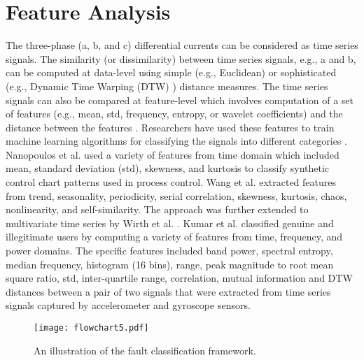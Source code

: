 \documentclass[conference]{IEEEtran}
\begin{document}
\section{Feature Analysis}
The three-phase (a, b, and c) differential currents can be considered as time series signals. The similarity (or dissimilarity) between time series signals, e.g., a and b, can be computed at data-level using simple (e.g., Euclidean) or sophisticated (e.g., Dynamic Time Warping (DTW) \cite{DTW}) distance measures. The time series signals can also be compared at feature-level which involves computation of a set of features (e.g., mean, std, frequency, entropy, or wavelet coefficients) and the distance between the features \cite{TimeSeriesFeatureRep}. Researchers have used these features to train machine learning algorithms for classifying the signals into different categories \cite{SuccessfulFeatTimeSeries}. Nanopoulos et al. \cite{NanopoulosTimeSeriesFeat} used a variety of features from time domain which included mean, standard deviation (std), skewness, and kurtosis to classify synthetic control chart patterns used in process control. Wang et al. \cite{WangTimeSeriesFeat} extracted features from trend, seasonality, periodicity, serial correlation, skewness, kurtosis, chaos, nonlinearity, and self-similarity. The approach was further extended to multivariate time series by Wirth et al. \cite{MultiVariateStructure}. Kumar et al. \cite{KumarTimeSeries, AbenaPrimo} classified genuine and illegitimate users by computing a variety of features from time, frequency, and power domains. The specific features included band power, spectral entropy, median frequency, histogram (16 bins), range, peak magnitude to root mean square ratio, std, inter-quartile range, correlation, mutual information and DTW distances between a pair of two signals that were extracted from time series signals captured by accelerometer and gyroscope sensors. %
\begin{figure}[htp!]
\centerline{\texttt{[image: flowchart5.pdf]}}
\vspace{-0.25in}
\caption{An illustration of the fault classification framework.}
\label{flowchart}
\end{figure}
\vspace{-0.15in}
\end{document}
